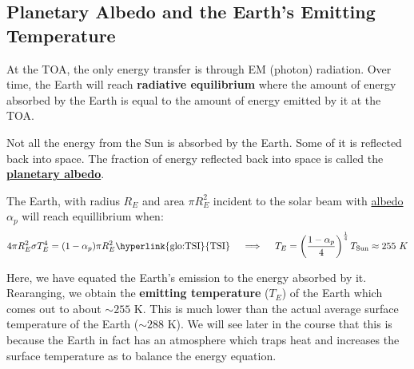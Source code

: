 \subsection{Planetary Albedo and the Earth's Emitting Temperature}
\label{sec:albedo}
At the \gls{TOA}, the only energy transfer is through EM (photon) radiation. Over time, the Earth will reach
\textbf{radiative equilibrium} where the amount of energy absorbed by the Earth is equal to the amount of energy emitted
by it at the \gls{TOA}.

\noindent Not all the energy from the Sun is absorbed by the Earth. Some of it is reflected back into space. The fraction
of energy reflected back into space is called the {\textbf{\hyperlink{glo:albedo}{planetary albedo}}}. 

The Earth, with radius $R_E$ and area $\pi R_E^2$ incident to the solar beam with \hyperlink{glo:albedo}{albedo} $\alpha_p$ 
will reach equillibrium when:
$$
4 \pi R_E^2 \sigma T_E^4 = (1 - \alpha_p) \pi R_E^2 \text{\hyperlink{glo:TSI}{TSI}} \quad \implies \quad T_E = \left(
\frac{1 - \alpha_p}{4} \right)^{\frac{1}{4}} T_{\text{Sun}} \approx 255\ K
$$

Here, we have equated the Earth's emission to the energy absorbed by it. Rearanging, we obtain the \textbf{emitting
temperature} ($T_E$) of the Earth which comes out to about $\sim 255$ K. This is much lower than the actual average surface
temperature of the Earth ($\sim 288$ K). We will see later in the course that this is because the Earth in fact has an 
atmosphere which traps heat and increases the surface temperature as to balance the energy equation.